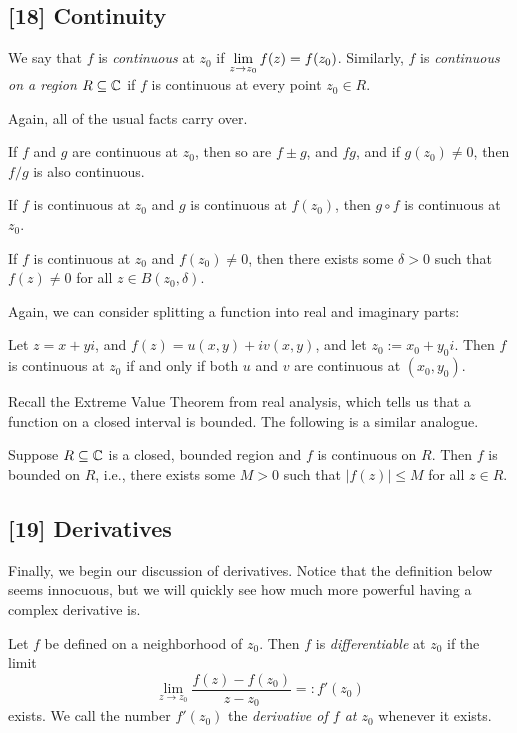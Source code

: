 \documentclass{article}
\begin{document}
\subsection*{[18] Continuity}
\begin{definition}
We say that $f$ is \textit{continuous} at $z_0$ if $\displaystyle\lim_{z\to z_0} f(z) = f(z_0)$. Similarly, $f$ is \textit{continuous on a region} $R\subseteq \mathbb C$ if $f$ is continuous at every point $z_0\in R$.
\end{definition}
Again, all of the usual facts carry over.
\begin{theorem}
If $f$ and $g$ are continuous at $z_0$, then so are $f\pm g$, and $fg$, and if $g(z_0)\neq 0$, then $f/g$ is also continuous.
\end{theorem}
\begin{theorem}
If $f$ is continuous at $z_0$ and $g$ is continuous at $f(z_0)$, then $g\circ f$ is continuous at $z_0$.
\end{theorem}
\begin{theorem}
If $f$ is continuous at $z_0$ and $f(z_0)\neq 0$, then there exists some $\delta > 0$ such that $f(z) \neq 0$ for all $z\in B(z_0, \delta)$.
\end{theorem}
Again, we can consider splitting a function into real and imaginary parts:
\begin{theorem}
Let $z=x+yi$, and $f(z) = u(x,y) + iv(x,y)$, and let $z_0:= x_0+y_0i$. Then $f$ is continuous at $z_0$ if and only if both $u$ and $v$ are continuous at $(x_0, y_0)$.
\end{theorem}
Recall the Extreme Value Theorem from real analysis, which tells us that a function on a closed interval is bounded. The following is a similar analogue.
\begin{theorem}
Suppose $R\subseteq\mathbb C$ is a closed, bounded region and $f$ is continuous on $R$. Then $f$ is bounded on $R$, i.e., there exists some $M>0$ such that $|f(z)| \leq M$ for all $z\in R$.
\end{theorem}
\subsection*{[19] Derivatives}
Finally, we begin our discussion of derivatives. Notice that the definition below seems innocuous, but we will quickly see how much more powerful having a complex derivative is.
\begin{definition}
Let $f$ be defined on a neighborhood of $z_0$. Then $f$ is \textit{differentiable} at $z_0$ if the limit
$$\lim_{z\to z_0} \frac{f(z) - f(z_0)}{z-z_0} =: f'(z_0)$$
exists. We call the number $f'(z_0)$ the \textit{derivative of $f$ at $z_0$} whenever it exists.
\end{definition}
\newpage
\setcounter{section}{27}
\end{document}

